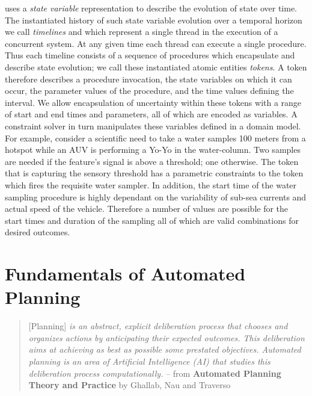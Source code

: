 \eu uses a \emph{state variable} representation to describe the
evolution of state over time. The instantiated history of such state
variable evolution over a temporal horizon we call \emph{timelines}
and which represent a single thread in the execution of a concurrent
system. At any given time each thread can execute a single procedure.
Thus each timeline consists of a sequence of procedures which
encapsulate and describe state evolution; we call these instantiated
atomic entities \emph{tokens}.  A token therefore describes a
procedure invocation, the state variables on which it can occur, the
parameter values of the procedure, and the time values defining the
interval. We allow encapsulation of uncertainty within these tokens
with a range of start and end times and parameters, all of which are
encoded as variables. A constraint solver in turn manipulates these
variables defined in a \eu domain model. For example, consider
a scientific need to take a water samples 100 meters from a hotspot
while an AUV is performing a Yo-Yo in the water-column. Two samples
are needed if the feature's signal is above a threshold; one
otherwise. The token that is capturing the sensory threshold has a
parametric constraints to the token which fires the requisite water
sampler. In addition, the start time of the water sampling procedure
is highly dependant on the variability of sub-sea currents and actual
speed of the vehicle. Therefore a number of values are possible for
the start times and duration of the sampling all of which are valid
combinations for desired outcomes.


\section{Fundamentals of  Automated Planning}
\label{sec:europa}

{\footnotesize
  \begin{quote}
[Planning] \emph{is an abstract, explicit deliberation process that chooses and
organizes actions by anticipating their expected outcomes. This
deliberation aims at achieving as best as possible some prestated
objectives. Automated planning is an area of Artificial Intelligence
(AI) that studies this deliberation process computationally.} -- from
\textbf{Automated Planning Theory and Practice} by Ghallab, Nau and
Traverso \cite{ghallab04} 
\end{quote}
}

